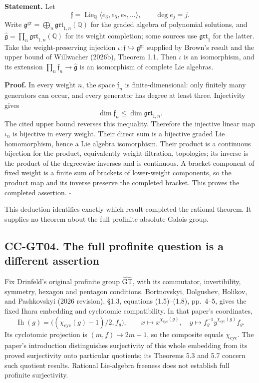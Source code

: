 \textbf{Statement.} Let \[
 \mathfrak f=\operatorname{Lie}_{\mathbb Q}\langle e_3,e_5,e_7,\ldots\rangle,
 \qquad \deg e_j=j.
\] Write
\(\mathfrak g^{\mathrm{gr}}=\bigoplus_n\mathfrak{grt}_{1,n}(\mathbb Q)\)
for the graded algebra of polynomial solutions, and
\(\widehat{\mathfrak g}=\prod_n\mathfrak{grt}_{1,n}(\mathbb Q)\) for its
weight completion; some sources use \(\mathfrak{grt}_1\) for the latter.
Take the weight-preserving injection
\(\iota:\mathfrak f\hookrightarrow\mathfrak g^{\mathrm{gr}}\) supplied
by Brown's result and the upper bound of Willwacher (2026b), Theorem
1.1. Then \(\iota\) is an isomorphism, and its extension
\(\prod_n\mathfrak f_n\to\widehat{\mathfrak g}\) is an isomorphism of
complete Lie algebras.

\textbf{Proof.} In every weight \(n\), the space \(\mathfrak f_n\) is
finite-dimensional: only finitely many generators can occur, and every
generator has degree at least three. Injectivity gives \[
 \dim\mathfrak f_n\le\dim\mathfrak{grt}_{1,n}.
\] The cited upper bound reverses this inequality. Therefore the
injective linear map \(\iota_n\) is bijective in every weight. Their
direct sum is a bijective graded Lie homomorphism, hence a Lie algebra
isomorphism. Their product is a continuous bijection for the product,
equivalently weight-filtration, topologies; its inverse is the product
of the degreewise inverses and is continuous. A bracket component of
fixed weight is a finite sum of brackets of lower-weight components, so
the product map and its inverse preserve the completed bracket. This
proves the completed assertion. \(\square\)

This deduction identifies exactly which result completed the rational
theorem. It supplies no theorem about the full profinite absolute Galois
group.

\subsection{CC-GT04. The full profinite question is a different
assertion}\label{cc-gt04.-the-full-profinite-question-is-a-different-assertion}

Fix Drinfeld's original profinite group \(\widehat{\mathrm{GT}}\), with
its commutator, invertibility, symmetry, hexagon and pentagon
conditions. Bortnovskyi, Dolgushev, Holikov, and Pashkovskyi (2026
revision), §1.3, equations (1.5)--(1.8), pp.~4--5, gives the fixed Ihara
embedding and cyclotomic compatibility. In that paper's coordinates, \[
 \operatorname{Ih}(g)=\bigl((\chi_{\mathrm{cyc}}(g)-1)/2,f_g\bigr),
 \qquad
 x\mapsto x^{\chi_{\mathrm{cyc}}(g)},\quad
 y\mapsto f_g^{-1}y^{\chi_{\mathrm{cyc}}(g)}f_g.
\] Its cyclotomic projection is \((m,f)\mapsto2m+1\), so the composite
equals \(\chi_{\mathrm{cyc}}\). The paper's introduction distinguishes
surjectivity of this whole embedding from its proved surjectivity onto
particular quotients; its Theorems 5.3 and 5.7 concern such quotient
results. Rational Lie-algebra freeness does not establish full profinite
surjectivity.

